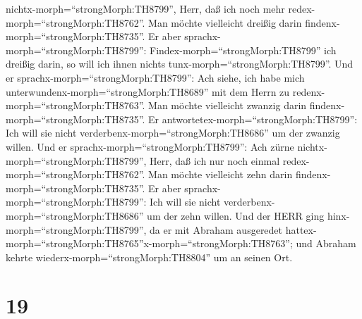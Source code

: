 nichtx-morph=``strongMorph:TH8799'', Herr, daß ich noch mehr
redex-morph=``strongMorph:TH8762''. Man möchte vielleicht dreißig darin
findenx-morph=``strongMorph:TH8735''. Er aber
sprachx-morph=``strongMorph:TH8799'':
Findex-morph=``strongMorph:TH8799'' ich dreißig darin, so will ich ihnen
nichts tunx-morph=``strongMorph:TH8799''.  Und er
sprachx-morph=``strongMorph:TH8799'': Ach siehe, ich habe mich
unterwundenx-morph=``strongMorph:TH8689'' mit dem Herrn zu
redenx-morph=``strongMorph:TH8763''. Man möchte vielleicht zwanzig darin
findenx-morph=``strongMorph:TH8735''. Er
antwortetex-morph=``strongMorph:TH8799'': Ich will sie nicht
verderbenx-morph=``strongMorph:TH8686'' um der zwanzig willen.
 Und er sprachx-morph=``strongMorph:TH8799'': Ach zürne
nichtx-morph=``strongMorph:TH8799'', Herr, daß ich nur noch einmal
redex-morph=``strongMorph:TH8762''. Man möchte vielleicht zehn darin
findenx-morph=``strongMorph:TH8735''. Er aber
sprachx-morph=``strongMorph:TH8799'': Ich will sie nicht
verderbenx-morph=``strongMorph:TH8686'' um der zehn willen.
 Und der HERR ging hinx-morph=``strongMorph:TH8799'', da er
mit Abraham ausgeredet
hattex-morph=``strongMorph:TH8765''x-morph=``strongMorph:TH8763''; und
Abraham kehrte wiederx-morph=``strongMorph:TH8804'' um an seinen Ort.

\hypertarget{section-18}{%
\section{19}\label{section-18}}

